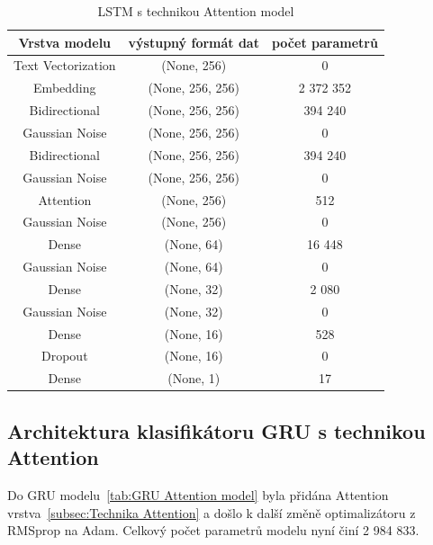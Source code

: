 \begin{table}[H]
	\centering
	\caption{LSTM s technikou Attention model}\label{tab:LSTM Attention model}
	\begin{tabular}{ c c c }
			\toprule
			Vrstva modelu & výstupný formát dat & počet parametrů\\
			\midrule
            Text Vectorization & (None, 256) & 0\\         
            Embedding & (None, 256, 256) & 2 372 352\\   
            Bidirectional & (None, 256, 256) & 394 240\\    
			Gaussian Noise & (None, 256, 256) & 0\\
            Bidirectional & (None, 256, 256) & 394 240\\
			Gaussian Noise & (None, 256, 256) & 0\\
			Attention & (None, 256) & 512\\
			Gaussian Noise & (None, 256) & 0\\
            Dense & (None, 64) & 16 448\\ 
			Gaussian Noise & (None, 64) & 0\\
			Dense & (None, 32) & 2 080\\ 
			Gaussian Noise & (None, 32) & 0\\
			Dense & (None, 16) & 528\\ 
            Dropout & (None, 16) & 0\\   
            Dense & (None, 1) & 17\\ 
			\midrule
		\end{tabular}
\end{table}

\subsection{Architektura klasifikátoru GRU s technikou Attention}\label{arch: GRU Attention}
Do GRU modelu~\ref{tab:GRU Attention model} byla přidána Attention vrstva~\ref{subsec:Technika Attention} a došlo k další změně optimalizátoru z RMSprop na Adam.
Celkový počet parametrů modelu nyní činí 2 984 833.

